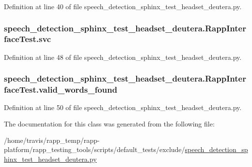 Definition at line 40 of file speech\-\_\-detection\-\_\-sphinx\-\_\-test\-\_\-headset\-\_\-deutera.\-py.

\hypertarget{classspeech__detection__sphinx__test__headset__deutera_1_1RappInterfaceTest_af37c9955eed702b8e91befb68348295e}{
\subsubsection[{svc}]{\setlength{\rightskip}{0pt plus 5cm}speech\-\_\-detection\-\_\-sphinx\-\_\-test\-\_\-headset\-\_\-deutera.\-Rapp\-Interface\-Test.\-svc}}\label{classspeech__detection__sphinx__test__headset__deutera_1_1RappInterfaceTest_af37c9955eed702b8e91befb68348295e}


Definition at line 48 of file speech\-\_\-detection\-\_\-sphinx\-\_\-test\-\_\-headset\-\_\-deutera.\-py.

\hypertarget{classspeech__detection__sphinx__test__headset__deutera_1_1RappInterfaceTest_a1c088592f7ee524c21da75f82e4b2aa7}{
\subsubsection[{valid\-\_\-words\-\_\-found}]{\setlength{\rightskip}{0pt plus 5cm}speech\-\_\-detection\-\_\-sphinx\-\_\-test\-\_\-headset\-\_\-deutera.\-Rapp\-Interface\-Test.\-valid\-\_\-words\-\_\-found}}\label{classspeech__detection__sphinx__test__headset__deutera_1_1RappInterfaceTest_a1c088592f7ee524c21da75f82e4b2aa7}


Definition at line 50 of file speech\-\_\-detection\-\_\-sphinx\-\_\-test\-\_\-headset\-\_\-deutera.\-py.



The documentation for this class was generated from the following file\-:\begin{DoxyCompactItemize}
\item 
/home/travis/rapp\-\_\-temp/rapp-\/platform/rapp\-\_\-testing\-\_\-tools/scripts/default\-\_\-tests/exclude/\hyperlink{speech__detection__sphinx__test__headset__deutera_8py}{speech\-\_\-detection\-\_\-sphinx\-\_\-test\-\_\-headset\-\_\-deutera.\-py}\end{DoxyCompactItemize}
